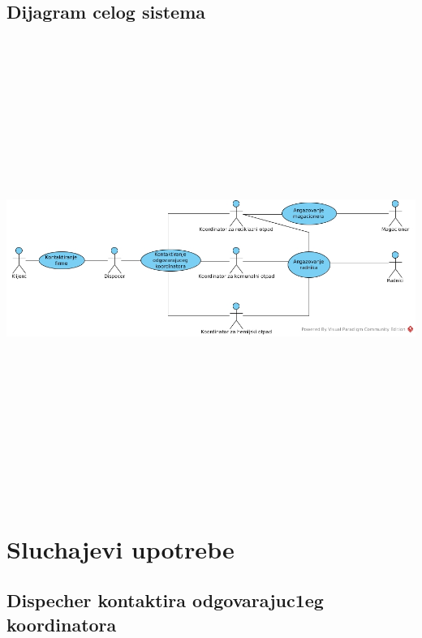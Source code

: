 \documentclass[10 pt]{article}
\begin{document}
\subsection{Dijagram celog sistema}
\begin{center}
	\includegraphics[width=15cm,height=15cm,keepaspectratio]{slike/DijagramCelogSistema}\\
\end{center}

\section{Sluchajevi upotrebe}


\subsection{Dispecher kontaktira odgovarajuc1eg koordinatora}
\end{document}
